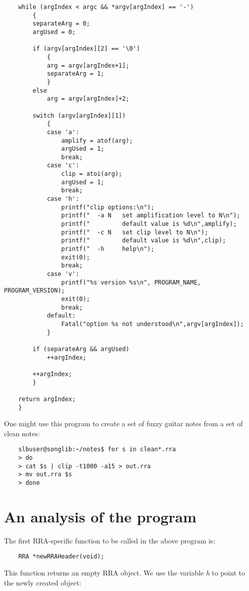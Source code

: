 \documentclass{article}
\begin{document}
\begin{verbatim}
    while (argIndex < argc && *argv[argIndex] == '-')
        {
        separateArg = 0;
        argUsed = 0;

        if (argv[argIndex][2] == '\0')
            {
            arg = argv[argIndex+1];
            separateArg = 1;
            }
        else
            arg = argv[argIndex]+2;

        switch (argv[argIndex][1])
            {
            case 'a':
                amplify = atof(arg);
                argUsed = 1;
                break;
            case 'c':
                clip = atoi(arg);
                argUsed = 1;
                break;
            case 'h':
                printf("clip options:\n");
                printf("  -a N   set amplification level to N\n");
                printf("         default value is %d\n",amplify);
                printf("  -c N   set clip level to N\n");
                printf("         default value is %d\n",clip);
                printf("  -h     help\n");
                exit(0);
                break;
            case 'v':
                printf("%s version %s\n", PROGRAM_NAME, PROGRAM_VERSION);
                exit(0);
                break;
            default:
                Fatal("option %s not understood\n",argv[argIndex]);
            }

        if (separateArg && argUsed)
            ++argIndex;

        ++argIndex;
        }

    return argIndex;
    }
\end{verbatim}

One might use this program to create a set of fuzzy guitar notes from
a set of clean notes:

\begin{verbatim}
    slbuser@songlib:~/notes$ for s in clean*.rra
    > do
    > cat $s | clip -t1000 -a15 > out.rra
    > mv out.rra $s
    > done
\end{verbatim}

\section*{An analysis of the program}

The first RRA-specific function to be called in the above program is:

\begin{verbatim}
    RRA *newRRAHeader(void);
\end{verbatim}

This function returns an empty RRA object. We use the variable {\it h} to
point to the newly created object:
\end{document}
